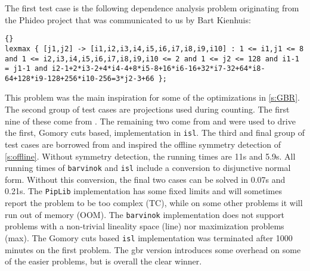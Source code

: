 The first test case is the following dependence analysis problem
originating from the Phideo project \parencite{Verhaegh1995PhD}
that was communicated to us by Bart Kienhuis:
\begin{lstlisting}[flexiblecolumns=true,breaklines=true]{}
lexmax { [j1,j2] -> [i1,i2,i3,i4,i5,i6,i7,i8,i9,i10] : 1 <= i1,j1 <= 8 and 1 <= i2,i3,i4,i5,i6,i7,i8,i9,i10 <= 2 and 1 <= j2 <= 128 and i1-1 = j1-1 and i2-1+2*i3-2+4*i4-4+8*i5-8+16*i6-16+32*i7-32+64*i8-64+128*i9-128+256*i10-256=3*j2-3+66 };
\end{lstlisting}
This problem was the main inspiration
for some of the optimizations in \autoref{s:GBR}.
The second group of test cases are projections used during counting.
The first nine of these come from \textcite{Seghir2006minimizing}.
The remaining two come from \textcite{Verdoolaege2005experiences} and
were used to drive the first, Gomory cuts based, implementation
in {\tt isl}.
The third and final group of test cases are borrowed from
\textcite{Bygde2010licentiate} and inspired the offline symmetry detection
of \autoref{s:offline}.  Without symmetry detection, the running times
are 11s and 5.9s.
All running times of {\tt barvinok} and {\tt isl} include a conversion
to disjunctive normal form.  Without this conversion, the final two
cases can be solved in 0.07s and 0.21s.
The {\tt PipLib} implementation has some fixed limits and will
sometimes report the problem to be too complex (TC), while on some other
problems it will run out of memory (OOM).
The {\tt barvinok} implementation does not support problems
with a non-trivial lineality space (line) nor maximization problems (max).
The Gomory cuts based {\tt isl} implementation was terminated after 1000
minutes on the first problem.  The gbr version introduces some
overhead on some of the easier problems, but is overall the clear winner.

